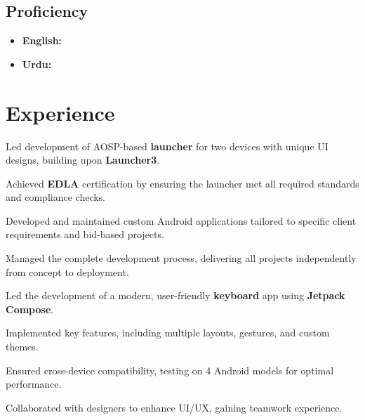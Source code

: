 \documentclass[bold]{deedy-resume-openfont}
\begin{document}
\begin{minipage}[t]{0.33\textwidth}
\subsection{Proficiency}
\begin{itemize}[label=\textbullet, leftmargin=*, topsep=5pt, itemsep=-1ex]
    \item \textbf{English:} 
    \item \textbf{Urdu:} 
\end{itemize}
\sectionsep



%
%

\end{minipage} 
\hfill
\begin{minipage}[t]{0.66\textwidth} 


\section{Experience}
 
\vspace{12pt} %
\begin{tightemize}
\item Led development of AOSP-based \textbf{launcher} for two devices with unique UI designs, building upon \textbf{Launcher3}.
\item Achieved \textbf{EDLA} certification by ensuring the launcher met all required standards and compliance checks.
\item Developed and maintained custom Android applications tailored to specific client requirements and bid-based projects.
\item Managed the complete development process, delivering all projects independently from concept to deployment.
\end{tightemize}

 
\vspace{2pt} %
\begin{tightemize}
\item Led the development of a modern, user-friendly \textbf{keyboard} app using \textbf{Jetpack Compose}.
\item Implemented key features, including multiple layouts, gestures, and custom themes.
\item Ensured cross-device compatibility, testing on 4 Android models for optimal performance.
\item Collaborated with designers to enhance UI/UX, gaining teamwork experience.
\end{tightemize}



\end{minipage}
\end{document}
